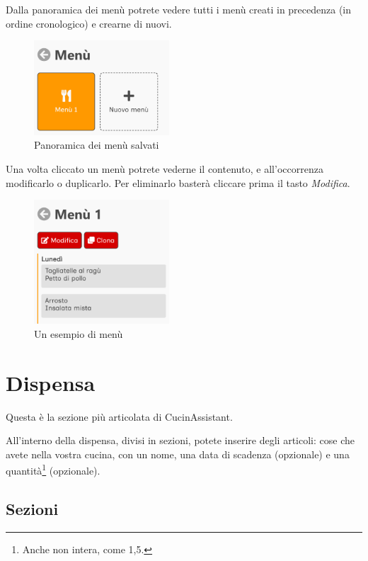 \documentclass[12pt, a4paper]{report}
\begin{document}
    Dalla panoramica dei menù potrete vedere tutti i menù creati in precedenza (in ordine cronologico) e crearne di nuovi.

    \begin{figure}[H]
        \centering
        \includegraphics[width=0.45\textwidth]{assets/it/menus.png}
        \caption{Panoramica dei menù salvati}
    \end{figure}

    Una volta cliccato un menù potrete vederne il contenuto, e all'occorrenza modificarlo o duplicarlo. Per eliminarlo basterà cliccare
    prima il tasto \emph{Modifica}.

    \begin{figure}[H]
        \centering
        \includegraphics[width=0.45\textwidth]{assets/it/menu.png}
        \caption{Un esempio di menù}
    \end{figure}



    \chapter{Dispensa}

    Questa è la sezione più articolata di CucinAssistant.

    All'interno della dispensa, divisi in sezioni, potete inserire degli articoli: cose che avete nella vostra cucina, con un nome, una data di
    scadenza (opzionale) e una quantità\footnote{Anche non intera, come 1,5.} (opzionale).

    \section{Sezioni}
\end{document}
